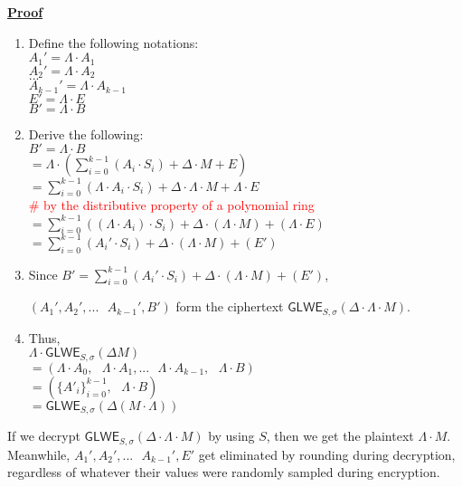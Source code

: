 \noindent \textbf{\underline{Proof}}
\begin{enumerate}
\item Define the following notations: \\
$A_1' = \Lambda \cdot A_1$ \\
$A_2' = \Lambda \cdot A_2$ \\
$...$ \\
$A_{k-1}' = \Lambda \cdot A_{k-1}$ \\
$E' = \Lambda \cdot E$ \\
$B' = \Lambda \cdot B$ \\
\item Derive the following: \\
$B' = \Lambda \cdot B$ \\
$= \Lambda \cdot (\sum\limits_{i=0}^{k-1}{(A_i \cdot S_i)} + \Delta \cdot M + E)$ 
$= \sum\limits_{i=0}^{k-1}{(\Lambda \cdot A_i \cdot S_i)} + \Delta \cdot \Lambda \cdot M + \Lambda \cdot E$   \\ \textcolor{red}{ \# by the distributive property of a polynomial ring} \\
$= \sum\limits_{i=0}^{k-1}{((\Lambda \cdot A_i) \cdot S_i)} + \Delta \cdot (\Lambda \cdot M) + (\Lambda \cdot E)$  \\
$= \sum\limits_{i=0}^{k-1}{(A_i' \cdot S_i)} + \Delta \cdot (\Lambda \cdot M) + (E')$ \\
\item Since $B' = \sum\limits_{i=0}^{k-1}{(A_i' \cdot S_i)} + \Delta \cdot (\Lambda \cdot M) + (E')$, 

$(A_1', A_2', ... \text{ } A_{k-1}'
, B')$ form the ciphertext $\textsf{GLWE}_{S, \sigma}(\Delta \cdot \Lambda \cdot M)$.
\item Thus, \\
$\Lambda \cdot \textsf{GLWE}_{S, \sigma}(\Delta M)$ \\
$ = (\Lambda \cdot A_0, \text { } \Lambda \cdot A_1, ... \text{ } \Lambda \cdot A_{k-1}, \text { } \Lambda \cdot B)$ \\
$ = ( \{A'_{i}\}_{i=0}^{k-1}, \text { } \Lambda \cdot B)$ \\
$= \textsf{GLWE}_{S, \sigma}(\Delta (M \cdot \Lambda) )$

\begin{flushright}
\qedsymbol{} 
\end{flushright}
\end{enumerate}

If we decrypt $\textsf{GLWE}_{S, \sigma}(\Delta \cdot \Lambda \cdot M)$ by using $S$, then we get the plaintext $\Lambda \cdot M$. Meanwhile, $A_1', A_2', ... \text{ } A_{k-1}', E'$ get eliminated by rounding during decryption, regardless of whatever their values were randomly sampled during encryption. 


